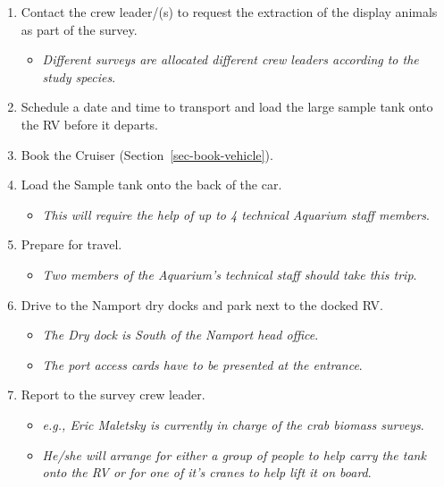 \documentclass[
  12pt,
]{report}
\providecommand{\tightlist}{%
  \setlength{\itemsep}{0pt}\setlength{\parskip}{0pt}}\usepackage{longtable,booktabs,array}
\begin{document}
\begin{enumerate}
\def\labelenumi{\arabic{enumi}.}
\tightlist
\item
  Contact the crew leader/(s) to request the extraction of the display
  animals as part of the survey.

  \begin{itemize}
  \tightlist
  \item
    \emph{Different surveys are allocated different crew leaders
    according to the study species}.
  \end{itemize}
\item
  Schedule a date and time to transport and load the large sample tank
  onto the RV before it departs.
\item
  Book the Cruiser (Section~\ref{sec-book-vehicle}).
\item
  Load the Sample tank onto the back of the car.

  \begin{itemize}
  \tightlist
  \item
    \emph{This will require the help of up to 4 technical Aquarium staff
    members}.
  \end{itemize}
\item
  Prepare for travel.

  \begin{itemize}
  \tightlist
  \item
    \emph{Two members of the Aquarium's technical staff should take this
    trip}.
  \end{itemize}
\item
  Drive to the Namport dry docks and park next to the docked RV.

  \begin{itemize}
  \tightlist
  \item
    \emph{The Dry dock is South of the Namport head office}.
  \item
    \emph{The port access cards have to be presented at the entrance}.
  \end{itemize}
\item
  Report to the survey crew leader.

  \begin{itemize}
  \tightlist
  \item
    \emph{e.g., Eric Maletsky is currently in charge of the crab biomass
    surveys}.
  \item
    \emph{He/she will arrange for either a group of people to help carry
    the tank onto the RV or for one of it's cranes to help lift it on
    board}.
  \end{itemize}
\end{enumerate}
\end{document}
